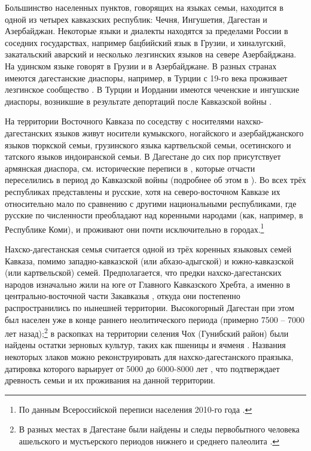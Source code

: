 Большинство населенных пунктов, говорящих на языках семьи, находится в одной из четырех кавказских республик: Чечня, Ингушетия, Дагестан и Азербайджан. Некоторые языки и диалекты находятся за пределами России в соседних государствах, например бацбийский язык в Грузии, и хиналугский, закатальский аварский и несколько лезгинских языков на севере Азербайджана. На удинском языке говорят в Грузии и в Азербайджане. В разных странах имеются дагестанские диаспоры, например, в Турции с 19-го века проживает лезгинское сообщество \citep{moor1985}. В Турции и Иордании имеются чеченские и ингушские диаспоры, возникшие в результате депортаций после Кавказской войны \citep[4]{nichols2011}. \color{purple}
\par На территории Восточного Кавказа по соседству с носителями нахско-дагестанских языков живут носители кумыкского, ногайского и азербайджанского языков тюркской семьи, грузинского языка картвельской семьи, осетинского и татского языков индоиранской семьи. В Дагестане до сих пор присутствует армянская диаспора, см. исторические переписи в \citep{multidag}, которые отчасти переселились в период до Кавказской войны (подробнее об этом в \citep{magomedkhanovmusaeva2015}). Во всех трёх республиках представлены и русские, хотя на северо-восточном Кавказе их относительно мало по сравнению с другими национальными республиками, где русские по численности преобладают над коренными народами (как, например, в Республике Коми), и проживают они почти исключительно в городах.\footnote{По данным Всероссийской переписи населения 2010-го года \citep{vpn2010}.}
\par Нахско-дагестанская семья считается одной из трёх коренных языковых семей Кавказа, помимо западно-кавказской (или абхазо-адыгской) и южно-кавказской (или картвельской) семей. Предполагается, что предки нахско-дагестанских народов изначально жили на юге от Главного Кавказского Хребта, а именно в центрально-восточной части Закавказья \citep[317]{schulze2013}, откуда они постепенно распространились по нынешней территории. Высокогорный Дагестан при этом был населен уже в конце раннего неолитического периода (примерно 7500 -- 7000 лет назад);\footnote{В разных местах в Дагестане были найдены и следы первобытного человека ашельского и мустьерского периодов нижнего и среднего палеолита \citep[12--13]{ataevetal1967}.} в раскопках на территории селения Чох (Гунибский район) были найдены остатки зерновых культур, таких как пшеницы и ячменя \citep{amirkhanov1987}. Названия некоторых злаков можно реконструировать для нахско-дагестанского праязыка, датировка которого варьирует от 5000 \citep[21]{koryakov2006} до 6000-8000 лет \citep{nicholsrange}, что подтверждает древность семьи и их проживания на данной территории.
